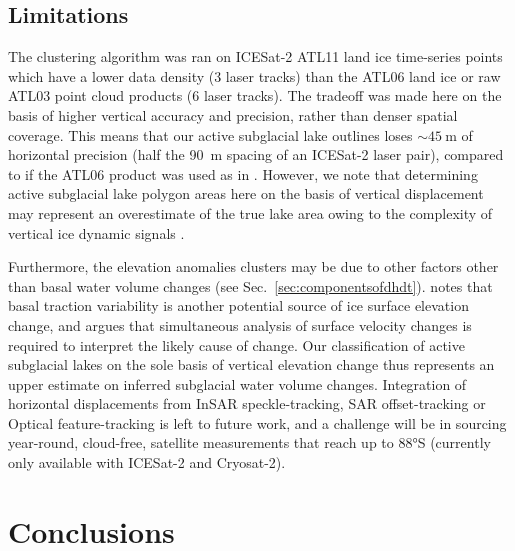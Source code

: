 \subsection{Limitations}

The clustering algorithm was ran on ICESat-2 ATL11 land ice time-series \citep{SmithATLASICESat2L3B2021} points which have a lower data density (3 laser tracks) than the ATL06 land ice \citep{SmithATLASICESat2L3A2020} or raw ATL03 \citep{NeumannATLASICESat2L2A2020} point cloud products (6 laser tracks).
The tradeoff was made here on the basis of higher vertical accuracy and precision, rather than denser spatial coverage.
This means that our active subglacial lake outlines loses $\sim\SI{45}{\metre}$ of horizontal precision (half the \SI{90}{\metre} spacing of an ICESat-2 laser pair), compared to if the ATL06 product was used as in \citet{SiegfriedIlluminatingactivesubglacial2021}.
However, we note that determining active subglacial lake polygon areas here on the basis of vertical displacement may represent an overestimate of the true lake area owing to the complexity of vertical ice dynamic signals \citep[c.f.][]{SergienkoCausessuddenshortterm2007,LiRadarSoundingConfirms2020}.

Furthermore, the elevation anomalies clusters may be due to other factors other than basal water volume changes (see Sec.~\ref{sec:componentsofdhdt}).
\citet{SergienkoCausessuddenshortterm2007} notes that basal traction variability is another potential source of ice surface elevation change, and argues that simultaneous analysis of surface velocity changes \citep[e.g.][]{SiegfriedEpisodicicevelocity2016} is required to interpret the likely cause of change.
Our classification of active subglacial lakes on the sole basis of vertical elevation change thus represents an upper estimate on inferred subglacial water volume changes.
Integration of horizontal displacements from InSAR speckle-tracking, SAR offset-tracking or Optical feature-tracking \citep[e.g.][]{GardnerIncreasedWestAntarctic2018} is left to future work, and a challenge will be in sourcing year-round, cloud-free, satellite measurements that reach up to 88°S (currently only available with ICESat-2 and Cryosat-2).

\section{Conclusions}

